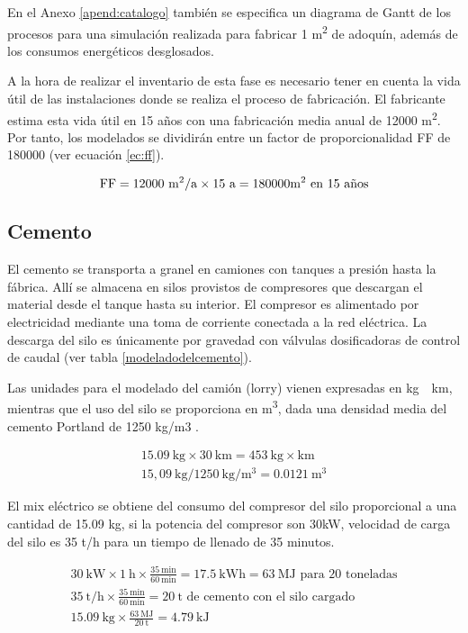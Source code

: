 En el Anexo \ref{apend:catalogo} también se especifica un diagrama de Gantt de los procesos para una simulación realizada para fabricar 1 \si{m^2} de adoquín, además de los consumos energéticos desglosados.

A la hora de realizar el inventario de esta fase es necesario tener en cuenta la vida útil de las instalaciones donde se realiza el proceso de fabricación. El fabricante estima esta vida útil en 15 años con una fabricación media anual de 12000 \si{m^2}. Por tanto, los modelados se dividirán entre un factor de proporcionalidad FF de 180000 (ver ecuación \ref{ec:ff}).

\begin{equation}\label{ec:ff}
\mathrm{FF = 12000\ m^2/a \times 15\ a = 180000 m^2 \text{ en 15 años}}\\
\end{equation}

\subsection{Cemento}
El cemento se transporta a granel en camiones con tanques a presión hasta la fábrica. Allí se almacena en silos provistos de compresores que descargan el material desde el tanque hasta su interior. El compresor es alimentado por electricidad mediante una toma de corriente conectada a la red eléctrica. La descarga del silo es únicamente por gravedad con válvulas dosificadoras de control de caudal (ver tabla \ref{modeladodelcemento}).

Las unidades para el modelado del camión (lorry) vienen expresadas en \si{kg\times km}, mientras que el uso del silo se proporciona en \si{m^3}, dada una densidad media del cemento Portland de 1250 \si{kg/m3} \cite{website:cement}.

\begin{gather}
\mathrm{15.09\ kg \times 30\ km = 453\ kg\times km}\\
\mathrm{15,09\ kg / 1250\ kg/m^3 = 0.0121\ m^3}
\end{gather}

El mix eléctrico se obtiene del consumo del compresor del silo proporcional a una cantidad de 15.09 \si{kg}, si la potencia del compresor son 30kW, velocidad de carga del silo es 35 \si{\tonne/h} para un tiempo de llenado de 35 minutos.

\begin{gather}
\mathrm{30\ kW \times 1\ h \times \frac{35\ min}{60\ min} = 17.5\ kWh = 63\ MJ \text{ para 20 toneladas}}\\
\mathrm{35\ t/h \times \frac{35\ min}{60\ min} = 20\ t \text{ de cemento con el silo cargado}}\\
\mathrm{15.09\ kg \times \frac{63\ MJ}{20\ t} = 4.79\ kJ}
\end{gather}


